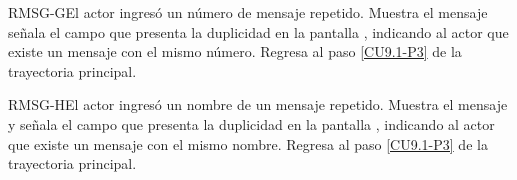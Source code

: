 	\begin{UCtrayectoriaA}{RMSG-G}{El actor ingresó un número de mensaje repetido.}
		\UCpaso[\UCsist] Muestra el mensaje  señala el campo que presenta la duplicidad en la pantalla , indicando al actor que existe un mensaje con el mismo número.
		\UCpaso Regresa al paso \ref{CU9.1-P3} de la trayectoria principal.
	\end{UCtrayectoriaA}
	
	\begin{UCtrayectoriaA}{RMSG-H}{El actor ingresó un nombre de un mensaje repetido.}
		\UCpaso[\UCsist] Muestra el mensaje  y señala el campo que presenta la duplicidad en la pantalla , indicando al actor que existe un mensaje con el mismo nombre.
		\UCpaso Regresa al paso \ref{CU9.1-P3} de la trayectoria principal.
	\end{UCtrayectoriaA}
